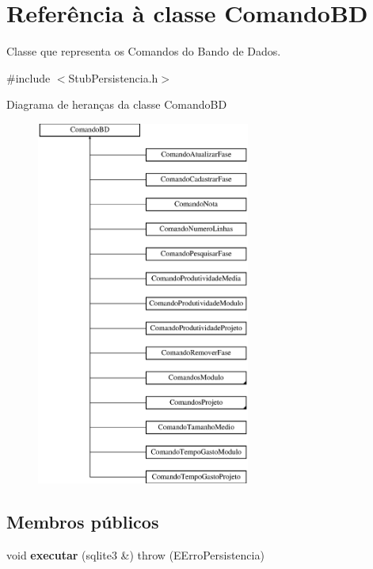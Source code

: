\hypertarget{class_comando_b_d}{
\section{\-Referência à classe \-Comando\-B\-D}
\label{class_comando_b_d}
}


\-Classe que representa os \-Comandos do \-Bando de \-Dados.  




{\ttfamily \#include $<$\-Stub\-Persistencia.\-h$>$}

\-Diagrama de heranças da classe \-Comando\-B\-D\begin{figure}[H]
\begin{center}
\leavevmode
\includegraphics[height=12.000000cm]{class_comando_b_d}
\end{center}
\end{figure}
\subsection*{\-Membros públicos}
\begin{DoxyCompactItemize}
\item 
\hypertarget{class_comando_b_d_ab01f0cb0bfadbad973b9b1313c657084}{
void {\bfseries executar} (sqlite3 \&)  throw (\-E\-Erro\-Persistencia)}
\label{class_comando_b_d_ab01f0cb0bfadbad973b9b1313c657084}

\end{DoxyCompactItemize}
